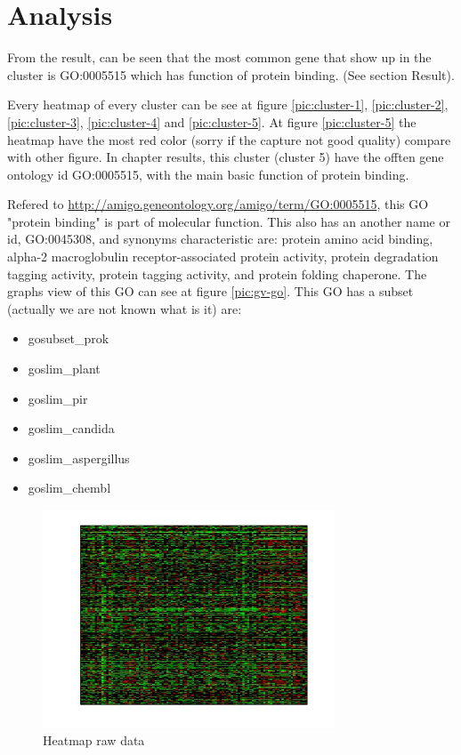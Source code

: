 \section{Analysis}
From the result, can be seen that the most common gene that show up in the cluster is GO:0005515 which has function of protein binding. (See section Result).

Every heatmap of every cluster can be see at figure \ref{pic:cluster-1}, \ref{pic:cluster-2}, \ref{pic:cluster-3}, \ref{pic:cluster-4} and \ref{pic:cluster-5}. At figure \ref{pic:cluster-5} the heatmap have the most red color (sorry if the capture not good quality) compare with other figure. In chapter results, this cluster (cluster 5) have the offten gene ontology id GO:0005515, with the main basic function of protein binding.

Refered to \href{http://amigo.geneontology.org/amigo/term/GO:0005515}{http://amigo.geneontology.org/amigo/term/GO:0005515}, this GO "protein binding" is part of molecular function. This also has an another name or id, GO:0045308, and synonyms characteristic are:  protein amino acid binding, alpha-2 macroglobulin receptor-associated protein activity, protein degradation tagging activity, protein tagging activity, and protein folding chaperone. The graphs view of this GO can see at figure \ref{pic:gv-go}. This GO has a subset (actually we are not known what is it) are:
\begin{itemize}
	\item gosubset\_prok
    \item goslim\_plant
    \item goslim\_pir
    \item goslim\_candida
    \item goslim\_aspergillus
    \item goslim\_chembl
\end{itemize}

\begin{figure}[htbp]
	\centering
	\includegraphics[height=6.5cm]{analisis/raw.jpg}
	\caption{Heatmap raw data}
	\label{pic:raw}
\end{figure}

